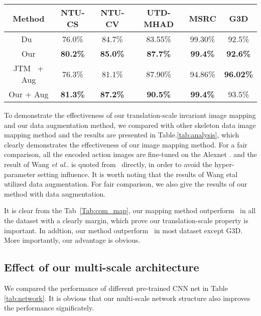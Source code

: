 \documentclass[10pt,journal]{IEEEtran}
\makeatletter
\DeclareRobustCommand\onedot{\futurelet\@let@token\@onedot}
\def\@onedot{\ifx\@let@token.\else.\null\fi\xspace}
\def\etal{\emph{et al}\onedot}
\makeatother
\begin{document}
\begin{table*}[!htb]
\begin{center}
\caption{Performance comparison of different mapping methods on the popular benchmard dataset } \label{tab:analysis}
\begin{tabular}{  c  c  c  c  c  c}
\hline
Method           &NTU-CS &NTU-CV &UTD-MHAD &MSRC &G3D \\
\hline
Du~\cite{Yong2015Skeleton} &76.0\% &84.7\% &83.55\% &99.30\% &{92.5\%}\\
Our     & \bf{80.2}\% &\bf{85.0}\% &\bf{87.7}\% &\bf{99.4}\% &\bf{92.6}\%\\
\hline
JTM~\cite{Wang2016Action} + Aug  &76.3\% &81.1\% &87.90\% &{94.86}\% &\bf{96.02}\%\\
Our + Aug   & \bf{81.3}\% &\bf{87.2}\% &\bf{90.5\%} &\bf{99.4\%} & 93.5\%\\
\hline
\end{tabular}
\end{center}
\label{Tab:com_map}
\end{table*}

To demonstrate the effectiveness of our translation-scale invariant image mapping and our data augmentation method, we compared with other skeleton data image mapping method and the results are presented in Table.\ref{tab:analysis}, which clearly demonstrates the effectiveness of our image mapping method. For a fair comparison, all the encoded action images are fine-tuned on the Alexnet \cite{krizhevsky2012imagenet}. and the result of Wang \etal is quoted from~\cite{Wang2016Action} directly, in order to avoid the hyper-parameter setting influence. It is worth noting that the results of Wang 
etal~\cite{Wang2016Action} utilized data augmentation. For fair comparison, we also give the results of our method with data augmentation.

It is clear from the Tab~\ref{Tab:com_map}, our mapping method outperform~\cite{Yong2015Skeleton} in all the dataset with a clearly margin, which prove our translation-scale property is important. In addtion, our method outperform~\cite{Wang2016Action} in most dataset except G3D. More importantly, our advantage is obvious.

\subsection{Effect of our multi-scale architecture}
We compared the performance of different pre-trained CNN net in Table \ref{tab:network}. It is obvious that our multi-scale network structure also improves the performance significately.
\end{document}
